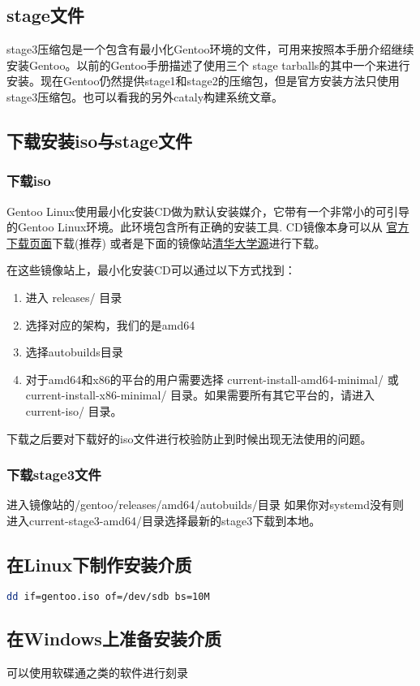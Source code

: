 \subsection{stage文件}
stage3压缩包是一个包含有最小化Gentoo环境的文件，可用来按照本手册介绍继续安装Gentoo。以前的Gentoo手册描述了使用三个 stage tarballs的其中一个来进行安装。现在Gentoo仍然提供stage1和stage2的压缩包，但是官方安装方法只使用stage3压缩包。也可以看我的另外cataly构建系统文章。


\subsection{下载安装iso与stage文件}
\subsubsection{下载iso}
Gentoo Linux使用最小化安装CD做为默认安装媒介，它带有一个非常小的可引导的Gentoo Linux环境。此环境包含所有正确的安装工具. CD镜像本身可以从
\href{http://distfiles.gentoo.org/releases/amd64/autobuilds/}{官方下载页面}下载(推荐) 或者是下面的镜像站\href{https://mirror.tuna.tsinghua.edu.cn/gentoo/releases/amd64/autobuilds/}{清华大学源}进行下载。

在这些镜像站上，最小化安装CD可以通过以下方式找到：
\begin{enumerate}
\item 进入 releases/ 目录
\item 选择对应的架构，我们的是amd64
\item 选择autobuilds目录
\item 对于amd64和x86的平台的用户需要选择 current-install-amd64-minimal/ 或 current-install-x86-minimal/ 目录。如果需要所有其它平台的，请进入 current-iso/ 目录。
\end{enumerate}

下载之后要对下载好的iso文件进行校验防止到时候出现无法使用的问题。


\subsubsection{下载stage3文件}
进入镜像站的/gentoo/releases/amd64/autobuilds/目录
如果你对systemd没有则进入current-stage3-amd64/目录选择最新的stage3下载到本地。


\subsection{在Linux下制作安装介质}

\begin{lstlisting}[language=Bash]
  dd if=gentoo.iso of=/dev/sdb bs=10M
\end{lstlisting}
\subsection{在Windows上准备安装介质}
可以使用软碟通之类的软件进行刻录
